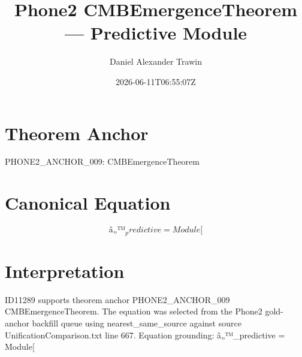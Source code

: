 \documentclass[11pt]{article}
\title{Phone2 CMBEmergenceTheorem — Predictive Module}
\author{Daniel Alexander Trawin}
\date{2026-06-11T06:55:07Z}
\begin{document}
\maketitle
\section*{Theorem Anchor}
PHONE2_ANCHOR_009: CMBEmergenceTheorem
\section*{Canonical Equation}
\[
â„™_predictive = Module[
\]
\section*{Interpretation}
ID11289 supports theorem anchor PHONE2_ANCHOR_009 CMBEmergenceTheorem. The equation was selected from the Phone2 gold-anchor backfill queue using nearest_same_source against source UnificationComparison.txt line 667. Equation grounding: â„™_predictive = Module[
\end{document}
